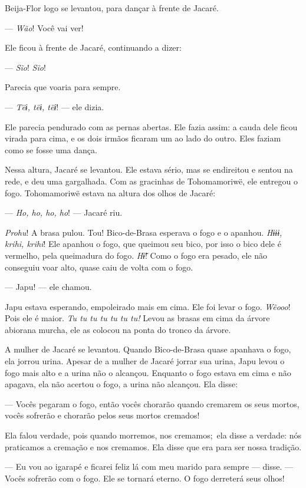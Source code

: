 Beija-Flor logo se levantou, para dançar à frente de Jacaré.

--- \textit{Wão}! Você vai ver!

Ele ficou à frente de Jacaré, continuando a dizer:

--- \textit{Sĩo}! \textit{Sĩo}!

Parecia que voaria para sempre. 

--- \textit{Tëɨ, tëɨ, tëɨ}! --- ele dizia. 

Ele parecia pendurado com as pernas abertas. Ele fazia assim: a cauda
 dele ficou virada para cima, e os dois irmãos ficaram um ao lado do
 outro. Eles faziam como se fosse uma dança. 


Nessa altura, Jacaré se levantou. Ele estava sério, mas se endireitou e
sentou na rede, e deu uma gargalhada. Com as gracinhas de Tohomamoriwë,
ele entregou o fogo. Tohomamoriwë estava na altura dos olhos de Jacaré: 

--- \textit{Ho, ho, ho, ho}! --- Jacaré riu. 

\textit{Prohu}! A brasa pulou. Tou! Bico-de-Brasa esperava o fogo e
o apanhou. \textit{Hɨɨɨ, krihi, krihi}! Ele apanhou o fogo, que queimou seu
bico, por isso o bico dele é vermelho, pela queimadura do
fogo. \textit{Hɨ̃}! Como o fogo era pesado, ele não conseguiu voar alto,
quase caiu de volta com o fogo. 

--- Japu! --- ele chamou.

Japu estava esperando, empoleirado mais em cima. Ele foi levar o fogo.
\textit{Wẽooo}! Pois ele é maior. \textit{Tu tu tu tu tu tu tu!} Levou as brasas em cima
da árvore abiorana murcha, ele as colocou na ponta do tronco da árvore. 

A mulher de Jacaré se levantou. Quando Bico-de-Brasa quase apanhava o
fogo, ela jorrou urina. Apesar de a mulher de Jacaré jorrar sua urina,
Japu levou o fogo mais alto e a urina não o alcançou. Enquanto
o fogo estava em cima e não apagava, ela não acertou o fogo, a urina não
alcançou. Ela disse:

--- Vocês pegaram o fogo, então vocês chorarão quando cremarem os seus
 mortos, vocês sofrerão e chorarão pelos seus mortos cremados! 

Ela falou verdade, pois quando morremos, nos cremamos;~ela disse a
verdade: nós praticamos a cremação e nos cremamos. Ela disse que era
para ser nossa tradição. 

--- Eu vou ao igarapé e ficarei feliz lá com meu marido para sempre ---
disse. --- Vocês sofrerão com o fogo. Ele se tornará eterno. O fogo
derreterá seus olhos! 


